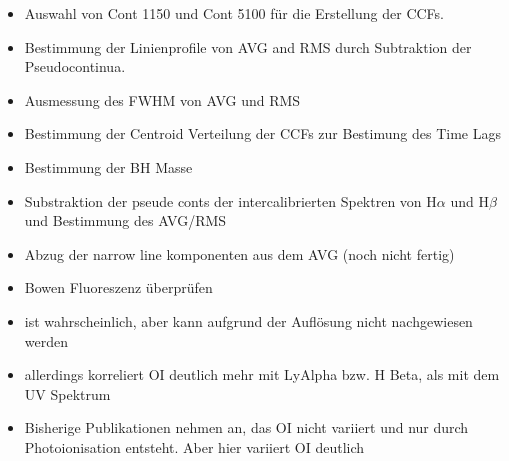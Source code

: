 \begin{itemize}
\begin{itemize}
	\end{itemize}
	\item Auswahl von Cont 1150 und Cont 5100 für die Erstellung der CCFs.
	\item Bestimmung der Linienprofile von AVG and RMS durch Subtraktion der Pseudocontinua.
	\item Ausmessung des FWHM von AVG und RMS 
	\item Bestimmung der Centroid Verteilung der CCFs zur Bestimung des Time Lags
	\item Bestimmung der BH Masse
	\item Substraktion der pseude conts der intercalibrierten Spektren von $\text{H}\alpha$ und $\text{H}\beta$ und Bestimmung des AVG/RMS
	\item Abzug der narrow line komponenten aus dem AVG (noch nicht fertig)
	
	\item Bowen Fluoreszenz überprüfen
	\item ist wahrscheinlich, aber kann aufgrund der Auflösung nicht nachgewiesen werden
	\item allerdings korreliert OI deutlich mehr mit LyAlpha bzw. H Beta, als mit dem UV Spektrum
	
	\item Bisherige Publikationen nehmen an, das OI nicht variiert und nur durch Photoionisation entsteht. Aber hier variiert OI deutlich
	
	
\end{itemize}
